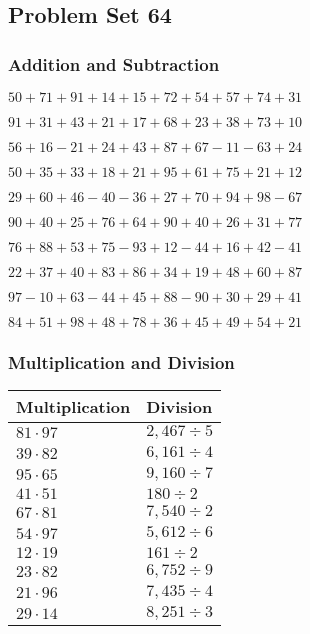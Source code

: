 \hypertarget{problem-set-64}{%
\subsection{Problem Set 64}\label{problem-set-64}}

\hypertarget{addition-and-subtraction}{%
\subsubsection{Addition and
Subtraction}\label{addition-and-subtraction}}

\(50+71+91+14+15+72+54+57+74+31\)

\(91+31+43+21+17+68+23+38+73+10\)

\(56+16-21+24+43+87+67-11-63+24\)

\(50+35+33+18+21+95+61+75+21+12\)

\(29+60+46-40-36+27+70+94+98-67\)

\(90+40+25+76+64+90+40+26+31+77\)

\(76+88+53+75-93+12-44+16+42-41\)

\(22+37+40+83+86+34+19+48+60+87\)

\(97-10+63-44+45+88-90+30+29+41\)

\(84+51+98+48+78+36+45+49+54+21\)

\hypertarget{multiplication-and-division}{%
\subsubsection{Multiplication and
Division}\label{multiplication-and-division}}

\begin{longtable}[]{@{}ll@{}}
\toprule
Multiplication & Division\tabularnewline
\midrule
\endhead
\(81\cdot97\) & \(2,467÷5\)\tabularnewline
\(39\cdot82\) & \(6,161÷4\)\tabularnewline
\(95\cdot65\) & \(9,160÷7\)\tabularnewline
\(41\cdot51\) & \(180÷2\)\tabularnewline
\(67\cdot81\) & \(7,540÷2\)\tabularnewline
\(54\cdot97\) & \(5,612÷6\)\tabularnewline
\(12\cdot19\) & \(161÷2\)\tabularnewline
\(23\cdot82\) & \(6,752÷9\)\tabularnewline
\(21\cdot96\) & \(7,435÷4\)\tabularnewline
\(29\cdot14\) & \(8,251÷3\)\tabularnewline
\bottomrule
\end{longtable}
